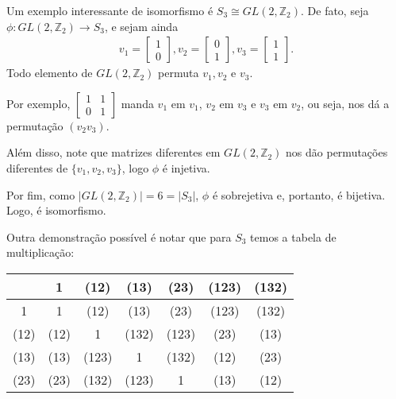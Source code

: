 	\begin{example}
	Um exemplo interessante de isomorfismo é $S_3\cong GL(2,\mathbb{Z}_2)$. De fato, seja
	$\phi:GL(2,\mathbb{Z}_2)\to S_3$, e sejam ainda
	\begin{align*}
        v_1 = 
        \begin{bmatrix}
            1 \\
            0
        \end{bmatrix}, 
        v_2 =
        \begin{bmatrix}
            0 \\ 
            1
        \end{bmatrix}, 
        v_3 =
        \begin{bmatrix}
            1 \\ 
            1
        \end{bmatrix}.
	\end{align*}
	Todo elemento de $GL(2,\mathbb{Z}_2)$ permuta $v_1, v_2$ e $v_3$.
	\par\vspace{0.3cm} Por exemplo, 
	$\begin{bmatrix}
	1 & 1 \\ 
	0 & 1
	\end{bmatrix}$
	manda $v_1$ em $v_1$, $v_2$ em $v_3$ e $v_3$ em $v_2$, ou seja, 
	nos dá a permutação $(v_2v_3)$.
	\par\vspace{0.3cm} Além disso, note que matrizes diferentes em 
	$GL(2, \mathbb{Z}_2)$ nos dão permutações diferentes de 
	$\{v_1, v_2,v_3\}$, logo $\phi$ é injetiva.
	\par\vspace{0.3cm} Por fim, como $|GL(2, \mathbb{Z}_2)| = 6 = |S_3|$,
	$\phi$ é sobrejetiva e, portanto, é bijetiva. Logo, é isomorfismo.
	\par\vspace{0.3cm} Outra demonstração possível é notar que para $S_3$
	temos a tabela de multiplicação:
	\begin{table}[H]
		\centering
		\noindent\begin{tabular}{c|cccccc}
			& 1 & (12) & (13) & (23) & (123) & (132) \\
			\hline
			1 & 1 & (12) & (13) & (23) & (123) & (132) \\
			(12) & (12) & 1 & (132) & (123) & (23) & (13) \\
			(13) & (13) & (123) & 1 & (132) & (12) & (23) \\
			(23) & (23) & (132) & (123) & 1 & (13) & (12) \\

\end{tabular}
\end{table}
\end{example}
